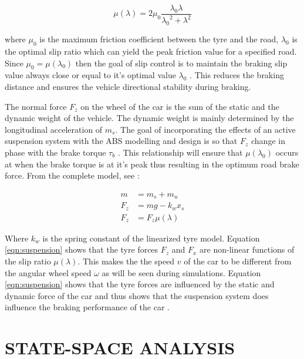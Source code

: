 \documentclass[10pt,twocolumn]{witseiepaper}
\begin{document}
\begin{equation}
	\mu (\lambda) = 2 \mu _0 \frac{\lambda _0 \lambda}{{\lambda _0} ^2 + \lambda ^ 2}
	\label{eqn:friction}
\end{equation}

where $\mu _0$ is the maximum friction coefficient between the tyre and the road, $\lambda _0$ is the optimal slip ratio which can yield the peak friction value for a specified road. Since $\mu _0 = \mu(\lambda _0)$ then the goal of slip control is to maintain the braking slip value always close or equal to it's optimal value $\lambda _0$ \cite{Pedro:2009}. This reduces the braking distance and ensures the vehicle directional stability during braking.


The normal force $F_z$ on the wheel of the car is the sum of the static and the dynamic weight of the vehicle. The dynamic weight is mainly determined by the longitudinal acceleration of $m_s$. The goal of incorporating the effects of an active suspension system with the ABS modelling and design is so that $F_z$ change in phase with the brake torque $\tau _b$ \cite{Alleyne:1997}. This relationship will ensure that $\mu (\lambda _0)$ occurs at when the brake torque is at it's peak thus resulting in the optimum road brake force. From the complete model, see \cite{Nyandoro1:2011}:

\begin{equation}
	\begin{align}
		m  &= m_s + m_u \\
		F_z &= mg - k_w x_s \\
		F_z &= F_z \mu (\lambda)
	\end{align}
	\label{eqn:suspension}
\end{equation}

Where $k_w$ is the spring constant of the linearized tyre model. Equation \ref{eqn:suspension} shows that the tyre forces $F_z$ and $F_x$ are non-linear functions of the slip ratio $\mu (\lambda)$. This makes the the speed $v$ of the car to be different from the angular wheel speed $\omega$ as will be seen during simulations. Equation \ref{eqn:suspension} shows that the tyre forces are influenced by the static and dynamic force of the car and thus shows that the suspension system does influence the braking performance of the car \cite{Pable:2007}.


\section{STATE-SPACE ANALYSIS}
\end{document}
